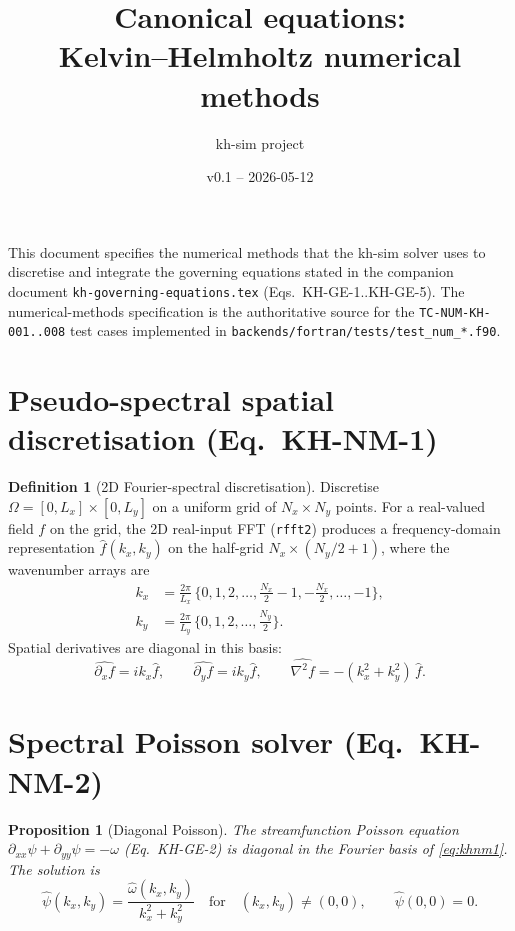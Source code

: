 \documentclass[11pt,a4paper]{article}
\title{Canonical equations:\\ Kelvin--Helmholtz numerical methods}
\author{kh-sim project}
\date{v0.1 -- 2026-05-12}
\theoremstyle{definition}
\newtheorem{definition}{Definition}
\theoremstyle{plain}
\newtheorem{proposition}{Proposition}
\begin{document}
\maketitle

This document specifies the numerical methods that the kh-sim solver
uses to discretise and integrate the governing equations stated in
the companion document \texttt{kh-governing-equations.tex}
(Eqs.~KH-GE-1..KH-GE-5). The numerical-methods specification is the
authoritative source for the \texttt{TC-NUM-KH-001..008} test cases
implemented in \texttt{backends/fortran/tests/test\_num\_*.f90}.

\section{Pseudo-spectral spatial discretisation (Eq.\ KH-NM-1)}

\begin{definition}[2D Fourier-spectral discretisation]
Discretise $\Omega = [0, L_x] \times [0, L_y]$ on a uniform grid of
$N_x \times N_y$ points. For a real-valued field $f$ on the grid,
the 2D real-input FFT (\texttt{rfft2}) produces a frequency-domain
representation $\hat f(k_x, k_y)$ on the half-grid
$N_x \times (N_y/2 + 1)$, where the wavenumber arrays are
\begin{align*}
k_x &= \frac{2\pi}{L_x}\,\{0, 1, 2, \ldots, \tfrac{N_x}{2}-1, -\tfrac{N_x}{2}, \ldots, -1\},\\
k_y &= \frac{2\pi}{L_y}\,\{0, 1, 2, \ldots, \tfrac{N_y}{2}\}.
\end{align*}
Spatial derivatives are diagonal in this basis:
\begin{equation}
\label{eq:khnm1}
\widehat{\partial_x f} = i k_x \hat f,
\qquad
\widehat{\partial_y f} = i k_y \hat f,
\qquad
\widehat{\nabla^2 f} = -(k_x^2 + k_y^2)\,\hat f.
\tag{KH-NM-1}
\end{equation}
\end{definition}

\section{Spectral Poisson solver (Eq.\ KH-NM-2)}

\begin{proposition}[Diagonal Poisson]
The streamfunction Poisson equation
$\partial_{xx}\psi + \partial_{yy}\psi = -\omega$
(Eq.~KH-GE-2) is diagonal in the Fourier basis of \eqref{eq:khnm1}.
The solution is
\begin{equation}
\label{eq:khnm2}
\hat\psi(k_x, k_y) = \frac{\hat\omega(k_x, k_y)}{k_x^2 + k_y^2}
\quad\text{for}\quad (k_x, k_y) \neq (0, 0),
\qquad
\hat\psi(0, 0) = 0.
\tag{KH-NM-2}
\end{equation}
\end{proposition}
\end{document}
